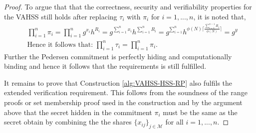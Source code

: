 \begin{proof}
To argue that that the correctness, security and verifiability properties for the VAHSS still holds after replacing  $\tau_i$ with $\pi_i$ for $i=1,...,n$, it is noted that,
\begin{align*}
&\prod_{i=1}^n \pi_i = \prod_{i=1}^n g^{x_i}h^{R_i} = g^{\sum_{i=1}^n x_i}h^{\sum_{i=1}^n R_i} = g^{\sum_{i=1}^n} h^{ \phi(N)\big\lceil \frac{\sum_{i=1}^{n-1}R_i}{\phi(N) }\big\rceil} = g^y \\
&\text{Hence it follows that: } \prod_{i=1}^n \tau_i = \prod_{i=1}^n \pi_i.
\end{align*}
Further the Pedersen commitment is perfectly hiding and computationally binding and hence it follows that the requirements is still fulfilled. 

It remains to prove that Construction \ref{alg:VAHSS-HSS-RP} also fulfils the extended verification requirement. This follows from the soundness of the range proofs or set membership proof used in the construction and by the argument above that the secret hidden in the commitment $\pi_i$ must be the same as the secret obtain by combining the the shares $\{x_{ij}\}_{j\in\mathcal{M}}$ for all $i=1,...,n$.

\begin{comment}
The correctness follows from the correctness of range proofs and by proving that $\sigma= \prod_{i=1}^n \pi_i \:\bigwedge\: \prod_{i=1}^n \pi_i = \mathcal{H}(y)$. Both $y$ and $\sigma$ are the same as in Construction \ref{alg:VAHSS-HSS}, hence by construction:
\begin{align}
    \label{eq:y=sum(x_ij)}
    y = \sum_{j=1}^m y_j= \sum_{j=1}^m \sum_{i=1}^n \lambda_{ij}p_i(\theta_{ij}) = \sum_{i=1}^n \overbrace{ \Big (\sum_{j=1}^m \lambda_{ij}p_i(\theta_{ij}) \Big)}^{ p_i(0)} = \sum_{i=1}^n p_i(0) = \sum_{i=1}^n x_i,
\end{align}
and for $\sigma$ it holds that:
\begin{align*}
    \sigma = \prod_{j=1}^m \sigma_j = \prod_{j=1}^m g^{y_j} = g^{\sum_{j=1}^my_j} =g^y = \mathcal{H}(y)
\end{align*}
For the $\pi_i$, whose construction has been modified compared to $\tau_i$ in  Construction\ref{alg:VAHSS-HSS}, thus it follows that:
\begin{align*}
    &\prod_{i=1}^n \pi_i = \prod_{i=1}^n \mathds{E}(x_i,R_i)= \prod_{i=1}^n g^{x_i}h^{R_i} = g^{\sum_{i=1}^n x_i } h^{\sum_{i=1}^n R_i} \overset{\eqref{eq:y=sum(x_ij)}}{=} g^y h^{\sum_{i=1}^{n-1} R_i+R_n} = \\ 
    &= g^y h^{ \phi(N)\big\lceil \frac{\sum_{i=1}^{n-1}R_i}{\phi(N) }\big\rceil} = g^y = \mathcal{H}(y) 
\end{align*}


\end{comment}
\end{proof}
